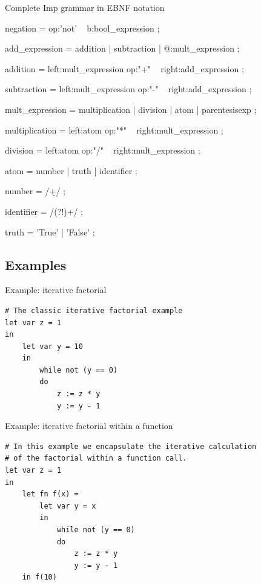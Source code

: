 \documentclass{beamer}
\begin{document}
\begin{frame}{Complete Imp grammar in EBNF notation}
\begin{python}
negation = op:'not' ~ b:bool_expression ;

add_expression = addition | subtraction | @:mult_expression ;

addition = left:mult_expression op:"+" ~ right:add_expression ;

subtraction = left:mult_expression op:"-" ~ right:add_expression ;

mult_expression = multiplication | division 
                | atom 
                | parentesisexp ;

multiplication = left:atom op:"*" ~ right:mult_expression ;

division = left:atom op:"/" ~ right:mult_expression ;

atom = number | truth | identifier ;
 
number = /\d+/ ;

identifier = /(?!\d)\w+/ ;

truth = 'True' | 'False' ;
\end{python}
\end{frame}

\subsection{Examples}


\begin{frame}[fragile]{Example: iterative factorial}
\begin{lstlisting}
# The classic iterative factorial example
let var z = 1 
in 
    let var y = 10 
    in 
        while not (y == 0)
        do 
            z := z * y
            y := y - 1
\end{lstlisting}
\end{frame}


\begin{frame}[fragile]{Example: iterative factorial within a function}
\begin{lstlisting}
# In this example we encapsulate the iterative calculation
# of the factorial within a function call.
let var z = 1
in 
    let fn f(x) =    
        let var y = x
        in      
            while not (y == 0)
            do 
                z := z * y
                y := y - 1
    in f(10)\end{lstlisting}
\end{frame}
\end{document}
